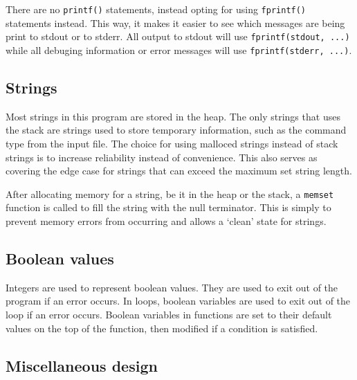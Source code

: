 \documentclass[a4paper, 12pt, titlepage]{article}
\newcommand{\code}[1]{\small\texttt{#1}\normalsize}
\begin{document}
There are no \code{printf()} statements, instead opting for using
\code{fprintf()} statements instead. This way, it makes it easier to
see which messages are being print to stdout or to stderr. All output
to stdout will use \code{fprintf(stdout, ...)} while all debuging
information or error messages will use \code{fprintf(stderr, ...)}.

\subsection{Strings}

Most strings in this program are stored in the heap. The only strings
that uses the stack are strings used to store temporary information,
such as the command type from the input file. The choice for using
malloced strings instead of stack strings is to increase reliability
instead of convenience. This also serves as covering the edge case
for strings that can exceed the maximum set string length.

After allocating memory for a string, be it in the heap or the stack,
a \code{memset} function is called to fill the string with the null
terminator. This is simply to prevent memory errors from occurring and
allows a `clean' state for strings.

\pagebreak
\subsection{Boolean values}

Integers are used to represent boolean values. They are used to exit
out of the program if an error occurs. In loops, boolean variables are
used to exit out of the loop if an error occurs. Boolean variables in
functions are set to their default values on the top of the function, then
modified if a condition is satisfied.

\subsection{Miscellaneous design}
\end{document}
